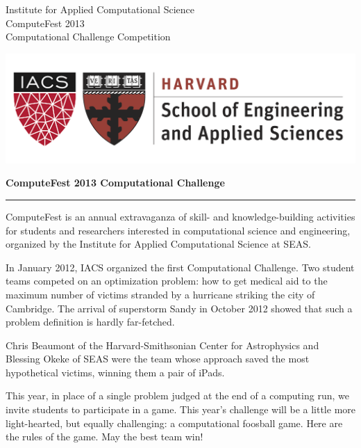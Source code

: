\documentclass[12pt,letterpaper,twoside]{article}
\begin{document}
\thispagestyle{empty}\vspace*{-0.75in}
\begin{minipage}[t]{0.5\linewidth}
  {\bssten Institute for Applied Computational Science \\
           ComputeFest 2013 \\
           Computational Challenge Competition}
\end{minipage}
\begin{minipage}[t]{0.5\linewidth}
  \vspace*{-22pt} \raggedleft \includegraphics[scale=0.5]{SEAS_IACS}
\end{minipage}

\vspace*{12pt}
{\centering \textbf{ComputeFest 2013 Computational Challenge}{ \par}}
\vspace*{-8pt}\noindent\rule{\linewidth}{1pt}

ComputeFest is an annual extravaganza of skill- and knowledge-building activities for students and researchers interested in computational science and engineering, organized by the Institute for Applied Computational Science at SEAS.

In January 2012, IACS organized the first Computational Challenge. Two student teams competed on an optimization problem: how to get medical aid to the maximum number of victims stranded by a hurricane striking the city of Cambridge. The arrival of superstorm Sandy in October 2012 showed that such a problem definition is hardly far-fetched. 

Chris Beaumont of the Harvard-Smithsonian Center for Astrophysics and Blessing Okeke of SEAS were the team whose approach saved the most hypothetical victims, winning them a pair of iPads.

This year, in place of a single problem judged at the end of a computing run, we invite students to participate in a game. This year's challenge will be a little more light-hearted, but equally challenging: a computational foosball game. Here are the rules of the game. May the best team win!
%
\vspace{4em}
\def\contentsname{\empty}
\tableofcontents
\end{document}
